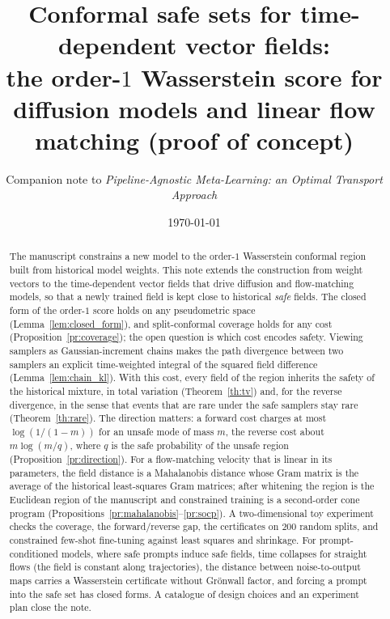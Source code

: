 \documentclass{article}
\title{Conformal safe sets for time-dependent vector fields:\\[3pt]
\large the order-$1$ Wasserstein score for diffusion models and linear flow matching
(proof of concept)}
\author{Companion note to \emph{Pipeline-Agnostic Meta-Learning: an Optimal Transport
Approach}}
\date{\today}
\theoremstyle{plain}
\begin{document}
\maketitle

\begin{abstract}
The manuscript constrains a new model to the order-$1$ Wasserstein conformal region built
from historical model weights. This note extends the construction from weight vectors to the
time-dependent vector fields that drive diffusion and flow-matching models, so that a newly
trained field is kept close to historical \emph{safe} fields. The closed form of the order-$1$
score holds on any pseudometric space (Lemma~\ref{lem:closed_form}), and split-conformal
coverage holds for any cost (Proposition~\ref{pr:coverage}); the open question is which cost
encodes safety. Viewing samplers as Gaussian-increment chains makes the path divergence
between two samplers an explicit time-weighted integral of the squared field difference
(Lemma~\ref{lem:chain_kl}). With this cost, every field of the region inherits the safety of the
historical mixture, in total variation (Theorem~\ref{th:tv}) and, for the reverse divergence, in
the sense that events that are rare under the safe samplers stay rare (Theorem~\ref{th:rare}).
The direction matters: a forward cost charges at most $\log(1/(1-m))$ for an unsafe mode of
mass $m$, the reverse cost about $m\log(m/q)$, where $q$ is the safe probability of the unsafe
region (Proposition~\ref{pr:direction}). For a flow-matching velocity that is linear in its
parameters, the field distance is a Mahalanobis distance whose Gram matrix is the average of the
historical least-squares Gram matrices; after whitening the region is the Euclidean region of the
manuscript and constrained training is a second-order cone program
(Propositions~\ref{pr:mahalanobis}--\ref{pr:socp}). A two-dimensional toy experiment checks the
coverage, the forward/reverse gap, the certificates on $200$ random splits, and constrained
few-shot fine-tuning against least squares and shrinkage. For prompt-conditioned models, where safe prompts induce
safe fields, time collapses for straight flows (the field is constant along trajectories), the
distance between noise-to-output maps carries a Wasserstein certificate without Gr\"onwall
factor, and forcing a prompt into the safe set has closed forms. A catalogue of design choices
and an experiment plan close the note.
\end{abstract}

\setcounter{tocdepth}{1}
\tableofcontents
\end{document}
